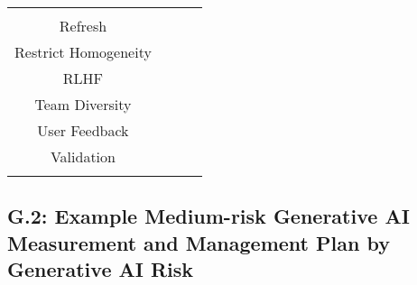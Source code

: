 \documentclass[fleqn]{article}
\begin{document}
\begin{landscape}
\begin{table}[H]
\begin{tabular}{|c|c|c|c|}
{			\textbullet\hspace{3pt} RAG\\ 	
			\textbullet\hspace{3pt} Refresh\\ 
			\textbullet\hspace{3pt} Restrict Homogeneity\\ 					
			\textbullet\hspace{3pt} RLHF\\ 
			\textbullet\hspace{3pt} Team Diversity\\ 	
			\textbullet\hspace{3pt} User Feedback\\ 	
			\textbullet\hspace{3pt} Validation\\ 					 	 
		}
		\\
		\hline
	\end{tabular}
	\label{table:med_risk_plan_by_tc_cont}
\end{table}

\vfill
\raisebox{-10pt}{\makebox[\linewidth]{\thepage}}

\pagebreak
\thispagestyle{empty}

\subsection*{G.2: Example Medium-risk Generative AI Measurement and Management Plan by Generative AI Risk}\label{appdxg2}


\end{landscape}
\end{document}
